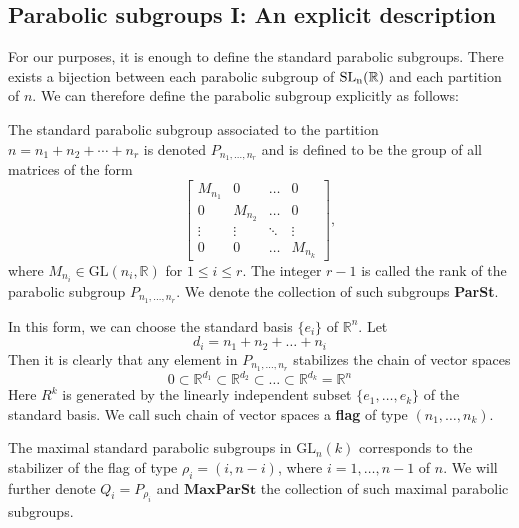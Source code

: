 \subsection{Parabolic subgroups I: An explicit description }
For our purposes, it is enough to define the standard parabolic subgroups.  There exists a bijection between each parabolic subgroup of $\operatorname{\text{SL}_n(\mathbb{R})}$
and each partition of $n$. We can therefore define the parabolic subgroup explicitly as follows:
\begin{definition}
    The standard parabolic subgroup associated to the partition $n = n_1 + n_2 + \cdots + n_r$ is denoted $P_{n_1,\ldots,n_r}$ and is defined to be the group of all matrices of the form
    \[
        \begin{bmatrix}
            M_{n_1} & 0       & \ldots & 0       \\
            0       & M_{n_2} & \ldots & 0       \\
            \vdots  & \vdots  & \ddots & \vdots  \\
            0       & 0       & \ldots & M_{n_k}
        \end{bmatrix} ,
    \]
    where $M_{n_i} \in \mathrm{GL}(n_i, \mathbb{R})$ for $1 \leq i \leq r$. The integer $r-1$ is called the rank of the parabolic subgroup $P_{n_1,\ldots,n_r}$.
    We denote the collection of such subgroups \textbf{ParSt}.
\end{definition}
In this form, we can choose the standard basis  $\{e_i\}$ of $\mathbb{R}^n$. Let 
\[d_i = n_1+n_2+\ldots+n_i\]
Then it is clearly that any element in $P_{n_1,\ldots,n_r}$ stabilizes the chain of vector spaces
\[0 \subset \mathbb{R}^{d_1} \subset \mathbb{R}^{d_2}\subset \ldots \subset \mathbb{R}^{d_k} = \mathbb{R}^n\]
Here $R^k$ is generated by the linearly independent subset $\{e_1,\ldots, e_k\}$ of the standard basis. 
We call such chain of vector spaces a \textbf{flag} of type $(n_1,\ldots,n_k)$.

\begin{definition}
    The maximal standard parabolic subgroups in $\text{GL}_n(k)$ corresponds to the
    stabilizer of the flag of type $\rho_i =(i,n-i)$, where $i = 1,\ldots,n-1$ of $n$. We will
    further denote $Q_i = P_{\rho_i}$ and $\textbf{MaxParSt}$ the collection of such maximal parabolic subgroups.
\end{definition}

